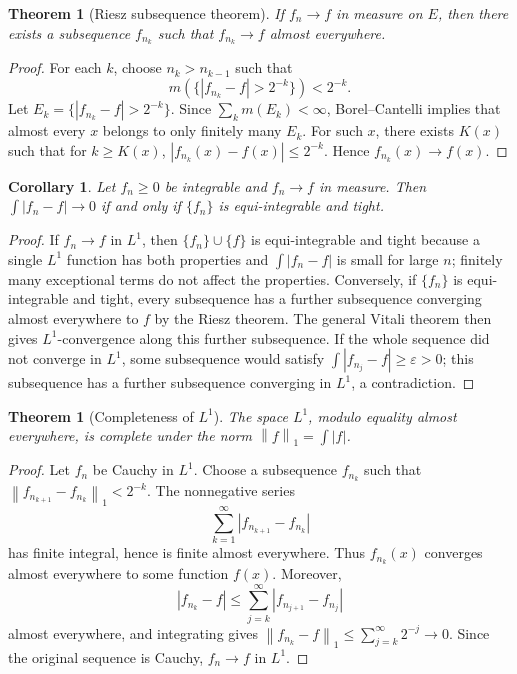 \documentclass[11pt,openany]{book}
\numberwithin{equation}{chapter}
\theoremstyle{definition}
\theoremstyle{plain}
\newtheorem{theorem}[definition]{Theorem}
\newtheorem{corollary}[definition]{Corollary}
\theoremstyle{remark}
\newcommand{\eps}{\varepsilon}
\newcommand{\1}{\mathbf{1}}
\newcommand{\abs}[1]{\left\lvert #1\right\rvert}
\newcommand{\norm}[1]{\left\lVert #1\right\rVert}
\begin{document}
\begin{theorem}[Riesz subsequence theorem]
If \(f_n\to f\) in measure on \(E\), then there exists a subsequence \(f_{n_k}\) such that \(f_{n_k}\to f\) almost everywhere.
\end{theorem}

\begin{proof}
For each \(k\), choose \(n_k>n_{k-1}\) such that
\[
    m(\{\abs{f_{n_k}-f}>2^{-k}\})<2^{-k}.
\]
Let \(E_k=\{\abs{f_{n_k}-f}>2^{-k}\}\).  Since \(\sum_km(E_k)<\infty\), Borel--Cantelli implies that almost every \(x\) belongs to only finitely many \(E_k\).  For such \(x\), there exists \(K(x)\) such that for \(k\ge K(x)\), \(\abs{f_{n_k}(x)-f(x)}\le2^{-k}\).  Hence \(f_{n_k}(x)\to f(x)\).
\end{proof}

\begin{corollary}
Let \(f_n\ge0\) be integrable and \(f_n\to f\) in measure.  Then \(\int\abs{f_n-f}\to0\) if and only if \(\{f_n\}\) is equi-integrable and tight.
\end{corollary}

\begin{proof}
If \(f_n\to f\) in \(L^1\), then \(\{f_n\}\cup\{f\}\) is equi-integrable and tight because a single \(L^1\) function has both properties and \(\int\abs{f_n-f}\) is small for large \(n\); finitely many exceptional terms do not affect the properties.  Conversely, if \(\{f_n\}\) is equi-integrable and tight, every subsequence has a further subsequence converging almost everywhere to \(f\) by the Riesz theorem.  The general Vitali theorem then gives \(L^1\)-convergence along this further subsequence.  If the whole sequence did not converge in \(L^1\), some subsequence would satisfy \(\int\abs{f_{n_j}-f}\ge\eps>0\); this subsequence has a further subsequence converging in \(L^1\), a contradiction.
\end{proof}

\begin{theorem}[Completeness of \(L^1\)]
The space \(L^1\), modulo equality almost everywhere, is complete under the norm \(\norm f_1=\int\abs f\).
\end{theorem}

\begin{proof}
Let \(f_n\) be Cauchy in \(L^1\).  Choose a subsequence \(f_{n_k}\) such that \(\norm{f_{n_{k+1}}-f_{n_k}}_1<2^{-k}\).  The nonnegative series
\[
    \sum_{k=1}^\infty \abs{f_{n_{k+1}}-f_{n_k}}
\]
has finite integral, hence is finite almost everywhere.  Thus \(f_{n_k}(x)\) converges almost everywhere to some function \(f(x)\).  Moreover,
\[
    \abs{f_{n_k}-f}\le\sum_{j=k}^\infty\abs{f_{n_{j+1}}-f_{n_j}}
\]
almost everywhere, and integrating gives \(\norm{f_{n_k}-f}_1\le\sum_{j=k}^\infty2^{-j}\to0\).  Since the original sequence is Cauchy, \(f_n\to f\) in \(L^1\).
\end{proof}
\end{document}
